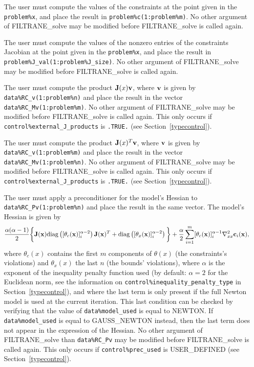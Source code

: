 \documentclass{galahad}
\newcommand{\packagename}{FILTRANE}
\newcommand{\sym}{\sf\small}
\begin{document}
\begin{description}
 The user must compute the values of the constraints at the
point given in the {\tt problem\%x}, and place the result
in {\tt problem\%c(1:problem\%m)}.
No other argument of \packagename\_solve may be modified 
before \packagename\_solve is called again.
 
 The user must compute the values of the nonzero entries of the
constraints Jacobian at the point given in the {\tt problem\%x}, and place 
the result in {\tt problem\%J\_val(1:problem\%J\_size)}.
No other argument of \packagename\_solve may be modified 
before \packagename\_solve is called again.

 The user must compute the product ${\mathbf{J}}(x) {\mathbf{v}}$, where
${\mathbf{v}}$ is given by {\tt data\%RC\_v(1:problem\%n)} and place the result in
the vector {\tt data\%RC\_Mv(1:problem\%m)}. No other argument of 
\packagename\_solve may be modified before \packagename\_solve is called
again. 
This only occurs if {\tt control\%external\_J\_products} is {\tt .TRUE.} 
(see Section~\ref{typecontrol}).

 The user must compute the product ${\mathbf{J}}(x)^T {\mathbf{v}}$, where
${\mathbf{v}}$ is given by {\tt data\%RC\_v(1:problem\%m)} and place the result in
the vector {\tt data\%RC\_Mv(1:problem\%n)}. No other argument of 
\packagename\_solve may be modified before \packagename\_solve is called
again. 
This only occurs if {\tt control\%external\_J\_products} is {\tt .TRUE.} 
(see Section~\ref{typecontrol}).

 The user must apply a
preconditioner for the model's Hessian to {\tt data\%RC\_Pv(1:problem\%n)} and
place the result in the same vector.  The model's Hessian is given by
\[
\frac{\alpha(\alpha - 1)}{2} \bigg\{
{\mathbf{J}}({\mathbf{x}}) {\rm diag}\left([\theta_c({\mathbf{x}})]_i^{\alpha-2}\right) {\mathbf{J}}({\mathbf{x}})^T 
+ {\rm diag}\left( [\theta_x({\mathbf{x}})]_i^{\alpha-2} \right)
\bigg\}
+ \frac{\alpha}{2} \sum_{i=1}^m [\theta_c({\mathbf{x}})]_i^{\alpha-1}
  \nabla_{xx}^2 {\mathbf{c}}_i({\mathbf{x}}), 
\]
where $\theta_c(x)$ contains the first $m$ components of $\theta(x)$ (the
constraints's violations) and $\theta_x(x)$ the last $n$ (the bounds'
violations), where $\alpha$ is the exponent of the inequality penalty
function used (by default: $\alpha = 2$ for the Euclidean norm, see the
information on {\tt control\%inequality\_penalty\_type} in
Section~\ref{typecontrol}), and where the last term is only present if the full
Newton model is used at the current iteration.  This last condition can be
checked by verifying that the value of {\tt data\%model\_used} is equal to
{\sym NEWTON}. If {\tt data\%model\_used} is equal to {\sym GAUSS\_NEWTON}
instead, then the last term does not appear in the expression of the Hessian.
No other argument of \packagename\_solve than {\tt data\%RC\_Pv} may be
modified  before \packagename\_solve is called again.
This only occurs if {\tt control\%prec\_used} is {\sym USER\_DEFINED} 
(see Section~\ref{typecontrol}).


\end{description}
\end{document}
